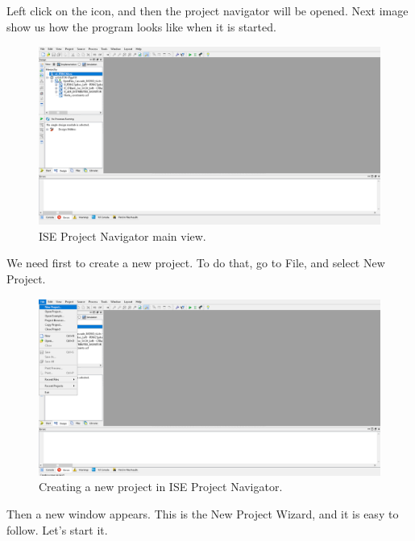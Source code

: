 Left click on the icon, and then the project navigator will be opened. Next image show us how the program looks like when it is started.

\begin{figure}[H]
\centering
\includegraphics[width=1\textwidth]{images/Img27_ISE_Init.PNG}
\caption{\label{fig:ISE_main_windows}ISE Project Navigator main view.}
\end{figure}

We need first to create a new project. To do that, go to File, and select New Project.

\begin{figure}[H]
\centering
\includegraphics[width=1\textwidth]{images/Img28_File_NewProject.PNG}
\caption{\label{fig:ISE_create_project}Creating a new project in ISE Project Navigator.}
\end{figure}

Then a new window appears. This is the New Project Wizard, and it is easy to follow. Let's start it.

